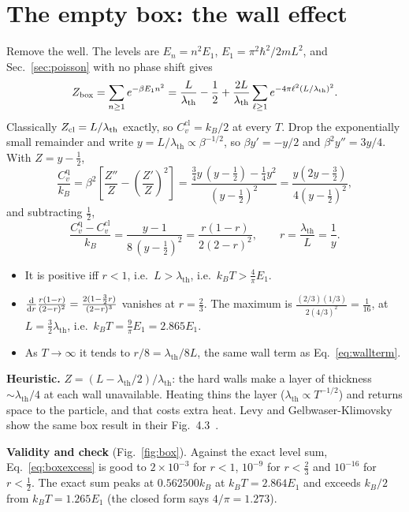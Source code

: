\documentclass[11pt]{article}
\numberwithin{equation}{section}
\newcommand{\lth}{\lambda_{\mathrm{th}}}
\newcommand{\Cq}{C_v^{\mathrm{q}}}
\newcommand{\Ccl}{C_v^{\mathrm{cl}}}
\newcommand{\kB}{k_{B}}
\begin{document}
\section{The empty box: the wall effect}
\label{sec:box}
Remove the well. The levels are $E_n=n^2E_1$, $E_1=\pi^2\hbar^2/2mL^2$, and Sec.~\ref{sec:poisson} with no phase shift gives
\begin{equation}
Z_{\rm box}=\sum_{n\ge1}e^{-\beta E_1n^2}=\frac{L}{\lth}-\frac12+\frac{2L}{\lth}\sum_{\ell\ge1}e^{-4\pi\ell^2(L/\lth)^2}.
\end{equation}
Classically $Z_{\rm cl}=L/\lth$ exactly, so $\Ccl=\kB/2$ at every $T$. Drop the exponentially small remainder and write $y=L/\lth\propto\beta^{-1/2}$, so $\beta y'=-y/2$ and $\beta^2y''=3y/4$. With $Z=y-\frac12$,
\begin{equation}
\frac{\Cq}{\kB}=\beta^2\left[\frac{Z''}{Z}-\left(\frac{Z'}{Z}\right)^2\right]=\frac{\frac34y\,(y-\frac12)-\frac14y^2}{(y-\frac12)^2}=\frac{y(2y-\frac32)}{4(y-\frac12)^2},
\end{equation}
and subtracting $\frac12$,
\begin{equation}
\boxed{\;\frac{\Cq-\Ccl}{\kB}=\frac{y-1}{8\,(y-\frac12)^2}=\frac{r(1-r)}{2(2-r)^2},\qquad r=\frac{\lth}{L}=\frac1y.\;}
\label{eq:boxexcess}
\end{equation}
\begin{itemize}[itemsep=2pt]
\item It is positive iff $r<1$, i.e.\ $L>\lth$, i.e.\ $\kB T>\frac{4}{\pi}E_1$.
\item $\dv{r}\frac{r(1-r)}{(2-r)^2}=\frac{2(1-\frac32r)}{(2-r)^3}$ vanishes at $r=\frac23$. The maximum is $\frac{(2/3)(1/3)}{2(4/3)^2}=\frac1{16}$, at $L=\frac32\lth$, i.e.\ $\kB T=\frac9\pi E_1=2.865E_1$.
\item As $T\to\infty$ it tends to $r/8=\lth/8L$, the same wall term as Eq.~\eqref{eq:wallterm}.
\end{itemize}
\textbf{Heuristic.} $Z=(L-\lth/2)/\lth$: the hard walls make a layer of thickness $\sim\lth/4$ at each wall unavailable. Heating thins the layer ($\lth\propto T^{-1/2}$) and returns space to the particle, and that costs extra heat. Levy and Gelbwaser-Klimovsky show the same box result in their Fig.~4.3~\cite[p.~95; discussed on p.~96]{LGK}.

\textbf{Validity and check} (Fig.~\ref{fig:box}). Against the exact level sum, Eq.~\eqref{eq:boxexcess} is good to $2\times10^{-3}$ for $r<1$, $10^{-9}$ for $r<\frac23$ and $10^{-16}$ for $r<\frac12$. The exact sum peaks at $0.562500\kB$ at $\kB T=2.864E_1$ and exceeds $\kB/2$ from $\kB T=1.265E_1$ (the closed form says $4/\pi=1.273$).
\end{document}
